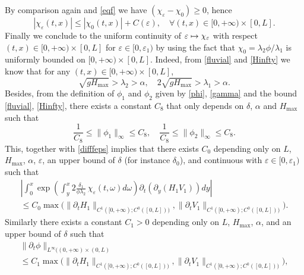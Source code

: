 \documentclass[11pt]{article}
\numberwithin{equation}{section}
\newcommand\mto{\mathchoice{\longmapsto}{\mapsto}{\mapsto}{\mapsto}}
\theoremstyle{definition}
\begin{document}
By {comparison} again and \eqref{eqf} we have $(\chi_{\varepsilon}-\chi_{0})\geq 0$, hence
\begin{equation*}
|\chi_{\varepsilon}(t,x)|\leq |\chi_{0}(t,x)|+ C(\varepsilon),\quad\forall (t,x)\in[0,+\infty)\times[0,L].
\end{equation*}
Finally we conclude to the uniform continuity of $\varepsilon\mto \chi_{\varepsilon}$ with respect $(t,x)\in[0,+\infty)\times[0,L]$ for $\varepsilon \in [0,\varepsilon_{1})$ by using the fact that $\chi_{0}=\lambda_{2}\phi/\lambda_{1}$ is uniformly bounded on $[0,+\infty)\times[0,L]$. Indeed, from \eqref{fluvial} and \eqref{Hinfty} we know that for any $(t,x)\in[0,{+}\infty)\times[0,L]$,
\begin{equation}
\sqrt{g H_{\max}}>\lambda_{2}>\alpha,\quad2\sqrt{gH_{\max}}>\lambda_{1}>\alpha.
\label{bornel1l2}
\end{equation}
Besides, from the definition of $\phi_{1}$ and $\phi_{2}$ given by \eqref{phi}, \eqref{gamma} and the bound \eqref{fluvial}, \eqref{Hinfty}, there exists a constant $C_{8}$ that only depends on
$\delta$, $\alpha$ and $H_{\max}$ such that
\begin{equation}
\frac{1}{C_{8}}\leq\lVert\phi_{1}\rVert_{\infty}\leq C_{8},\quad\frac{1}{C_{8}}\leq\lVert\phi_{2}\rVert_{\infty}\leq C_{8}.
\label{bornephi1phi2}
\end{equation}
This, together with \eqref{difffeps} implies that there exists $C_{0}$ depending only on $L$, $H_{\max}$, $\alpha$, $\varepsilon$, {an upper bound of $\delta$ (for instance $\delta_{0}$),} and continuous with $\varepsilon\in[0,\varepsilon_{1})$ such that
\begin{multline*}
\left|\int_{0}^{x}\exp\left(\int_{y}^{x}2\frac{\delta_{1}}{\phi\lambda_{2}}\,\chi_{\varepsilon}(t,\omega) d\omega\right)\partial_{t}(\partial_{y}(H_{1}V_{1}))dy\right|\\
\leq C_{0} \max \bigl(\lVert\partial_{t}H_{1}\rVert_{C^{1}([0,+\infty);C^{0}([0,L]))},\lVert\partial_{t}V_{1}\rVert_{C^{1}([0,+\infty);C^{0}([0,L]))}\bigr).
\end{multline*}
Similarly
there exists a constant $C_{1}>0$ depending only on $L$, $H_{\max}$, $\alpha${, and an upper bound of $\delta$} such that
\begin{multline}
\label{dphi}
\rVert \partial_{t}{\phi}\lVert_{L^{\infty}((0,+\infty)\times(0,L)}\\
\leq C_{1} \max \bigl(\lVert\partial_{t}H_{1}\rVert_{C^{1}([0,+\infty);C^{0}([0,L]))},\lVert\partial_{t}V_{1}\rVert_{C^{1}([0,+\infty);C^{0}([0,L]))} \bigr),
\end{multline}
\end{document}

